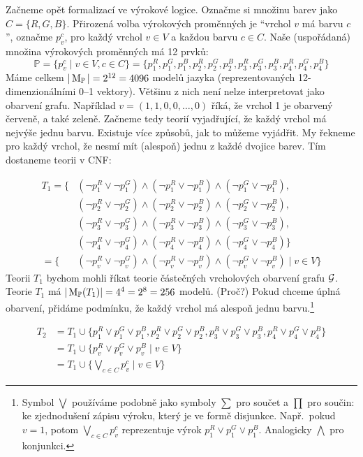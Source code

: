 Začneme opět formalizací ve výrokové logice. Označme si množinu barev jako \( C=\{R,G,B\} \).  Přirozená volba výrokových proměnných je ``vrchol \(v\) má barvu \(c\)'', označme \(p_v^c\), pro každý vrchol \(v \in V\) a každou barvu \(c\in C\). Naše (uspořádaná) množina výrokových proměnných má 12 prvků:
\[
\mathbb P=\{p_v^c\mid v\in V,c\in C\}=\{p_1^R,p_1^G,p_1^B,p_2^R,p_2^G,p_2^B,p_3^R,p_3^G,p_3^B,p_4^R,p_4^G,p_4^B\}
\]
Máme celkem \( |\operatorname{M}_\mathbb P|=2^{12}=4096 \) modelů jazyka (reprezentovaných 12-dimenzionálními 0--1 vektory). Většinu z nich není nelze interpretovat jako obarvení grafu. Například \( v=(1,1,0,0,\dots,0) \) říká, že vrchol 1 je obarvený červeně, a také zeleně. Začneme tedy teorií vyjadřující, že každý vrchol má nejvýše jednu barvu. Existuje více způsobů, jak to můžeme vyjádřit. My řekneme pro každý vrchol, že nesmí mít (alespoň) jednu z každé dvojice barev. Tím dostaneme teorii v {CNF}:

\begin{align*}
T_1 = \{ 
&(\neg p_1^R \lor \neg p_1^G) \land (\neg p_1^R \lor \neg p_1^B) \land (\neg p_1^G \lor \neg p_1^B),\\
&(\neg p_2^R \lor \neg p_2^G) \land (\neg p_2^R \lor \neg p_2^B) \land (\neg p_2^G \lor \neg p_2^B),\\
&(\neg p_3^R \lor \neg p_3^G) \land (\neg p_3^R \lor \neg p_3^B) \land (\neg p_3^G \lor \neg p_3^B),\\
&(\neg p_4^R \lor \neg p_4^G) \land (\neg p_4^R \lor \neg p_4^B) \land (\neg p_4^G \lor \neg p_4^B)\} \\
    = \{ &(\neg p_v^R \lor \neg p_v^G) \land (\neg p_v^R \lor \neg p_v^B) \land (\neg p_v^G \lor \neg p_v^B) \mid v \in V \} 
\end{align*}
Teorii \(T_1\) bychom mohli říkat teorie částečných vrcholových obarvení grafu \(\mathcal{G}\). Teorie \(T_1\) má \(|\operatorname{M}_\mathbb P(T_1)|= 4^4=2^8=256\) modelů. (Proč?) Pokud chceme úplná obarvení, přidáme podmínku, že každý vrchol má alespoň jednu barvu.\footnote{Symbol \(\bigvee \) používáme podobně jako symboly \(\sum \) pro součet a \(\prod \) pro součin: ke zjednodušení zápisu výroku, který je ve formě disjunkce. Např.\ pokud \(v=1\), potom \( \bigvee_{c\in C} p_v^c \) reprezentuje výrok \( p_1^R \lor p_1^G \lor p_1^B \). Analogicky \(\bigwedge \) pro konjunkci.}

\begin{align*}
T_2 &= T_1\cup \{p_1^R \lor p_1^G \lor p_1^B, p_2^R \lor p_2^G \lor p_2^B, p_3^R \lor p_3^G \lor p_3^B, p_4^R \lor p_4^G \lor p_4^B\} \\
    &= T_1\cup \{ p_v^R \lor p_v^G \lor p_v^B \mid v \in V \} \\
    &= T_1\cup \{\bigvee_{c\in C} p_v^c \mid v \in V \}  
\end{align*}

